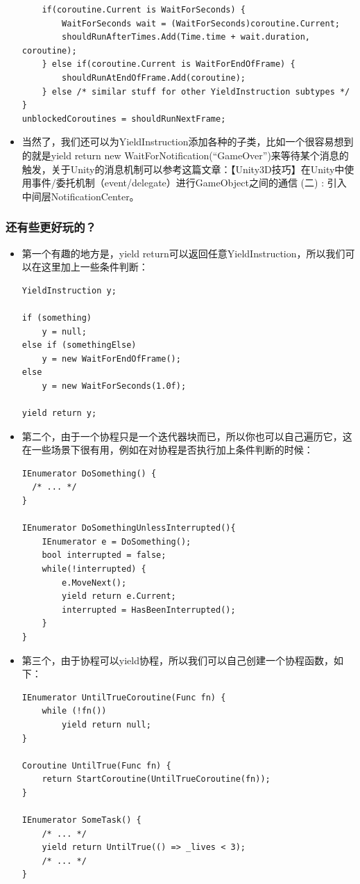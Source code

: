 \documentclass[9pt, b5paper]{article}
\begin{document}
\begin{itemize}
\begin{verbatim}
    if(coroutine.Current is WaitForSeconds) {    
        WaitForSeconds wait = (WaitForSeconds)coroutine.Current;
        shouldRunAfterTimes.Add(Time.time + wait.duration, coroutine);
    } else if(coroutine.Current is WaitForEndOfFrame) {    
        shouldRunAtEndOfFrame.Add(coroutine);
    } else /* similar stuff for other YieldInstruction subtypes */
}
unblockedCoroutines = shouldRunNextFrame;
\end{verbatim}
\item 当然了，我们还可以为YieldInstruction添加各种的子类，比如一个很容易想到的就是yield return new WaitForNotification(“GameOver”)来等待某个消息的触发，关于Unity的消息机制可以参考这篇文章：【Unity3D技巧】在Unity中使用事件/委托机制（event/delegate）进行GameObject之间的通信 (二) : 引入中间层NotificationCenter。
\end{itemize}

\subsubsection{还有些更好玩的？}
\label{sec:org190c52e}
\begin{itemize}
\item 第一个有趣的地方是，yield return可以返回任意YieldInstruction，所以我们可以在这里加上一些条件判断：
\begin{verbatim}
YieldInstruction y;

if (something)
    y = null;
else if (somethingElse)
    y = new WaitForEndOfFrame();
else
    y = new WaitForSeconds(1.0f);

yield return y;
\end{verbatim}
\item 第二个，由于一个协程只是一个迭代器块而已，所以你也可以自己遍历它，这在一些场景下很有用，例如在对协程是否执行加上条件判断的时候：
\begin{verbatim}
IEnumerator DoSomething() {
  /* ... */
}
 
IEnumerator DoSomethingUnlessInterrupted(){
    IEnumerator e = DoSomething();
    bool interrupted = false;
    while(!interrupted) {  
        e.MoveNext();
        yield return e.Current;
        interrupted = HasBeenInterrupted();
    }
}
\end{verbatim}
\item 第三个，由于协程可以yield协程，所以我们可以自己创建一个协程函数，如下：
\begin{verbatim}
IEnumerator UntilTrueCoroutine(Func fn) {
    while (!fn()) 
        yield return null;
}
 
Coroutine UntilTrue(Func fn) {
    return StartCoroutine(UntilTrueCoroutine(fn));
}
 
IEnumerator SomeTask() {
    /* ... */
    yield return UntilTrue(() => _lives < 3);
    /* ... */
}
\end{verbatim}
\end{itemize}
\end{document}
